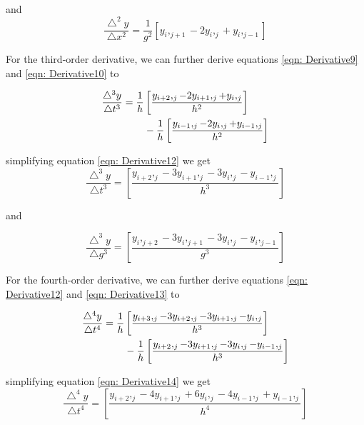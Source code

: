 \documentclass[conference]{IEEEtran}
\begin{document}
	and 
	\begin{equation}
		\label{eqn: Derivative10}
		\frac{\bigtriangleup^2 y}{\bigtriangleup x^2} =\frac{1}{g^2}\left[{y_{i},_{j+1} - 2 y_{i},_{j} + y_{i},_{j-1}} \right]
	\end{equation}
	
	For the third-order derivative, we can further derive equations \eqref{eqn: Derivative9} and \eqref{eqn: Derivative10} to
	
	\begin{align}
		\label{eqn: Derivative11}
		\frac{\bigtriangleup^3 y}{\bigtriangleup t^3} = \frac{1}{h} &\left[\frac{y_{i+2},_{j} - 2 y_{i+1},_{j} + y_{i},_{j}}{h^2}\right]\\
		&-\frac{1}{h}\left[\frac{y_{i-1},_{j} - 2 y_{i},_{j} + y_{i-1},_{j}}{h^2}\right]\notag
	\end{align}
	
	simplifying equation \eqref{eqn: Derivative12} we get
	\begin{equation}
		\label{eqn: Derivative12}
		\frac{\bigtriangleup^3 y}{\bigtriangleup t^3} =\left[\frac{y_{i+2},_{j} - 3 y_{i+1},_{j} - 3 y_{i},_{j} - y_{i-1},_{j}}{h^3}\right]
	\end{equation}
	
	and 
	
	\begin{equation}
		\label{eqn: Derivative13}
		\frac{\bigtriangleup^3 y}{\bigtriangleup g^3} =\left[\frac{y_{i},_{j+2} - 3 y_{i},_{j+1} - 3 y_{i},_{j} - y_{i},_{j-1}}{g^3}\right]
	\end{equation}

	For the fourth-order derivative, we can further derive equations \eqref{eqn: Derivative12} and \eqref{eqn: Derivative13} to
	
	\begin{align}
		\label{eqn: Derivative14}
		\frac{\bigtriangleup^4 y}{\bigtriangleup t^4} = \frac{1}{h} &\left[\frac{y_{i+3},_{j} - 3 y_{i+2},_{j} - 3 y_{i+1},_{j} - y_{i},_{j}}{h^3}\right]\\
		&-\frac{1}{h}\left[\frac{y_{i+2},_{j} - 3 y_{i+1},_{j} - 3 y_{i},_{j} - y_{i-1},_{j}}{h^3}\right]\notag
	\end{align}

	simplifying equation \eqref{eqn: Derivative14} we get
	\begin{equation}
		\label{eqn: Derivative15}
		\frac{\bigtriangleup^4 y}{\bigtriangleup t^4} =\left[\frac{y_{i+2},_{j} - 4 y_{i+1},_{j} + 6 y_{i},_{j} - 4 y_{i-1},_{j} + y_{i-1},_{j}}{h^4} \right]
	\end{equation}
\end{document}
